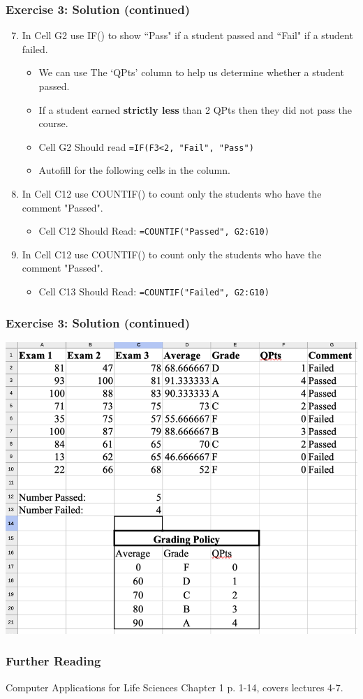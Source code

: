 \documentclass[12pt]{beamer}
\begin{document}
\begin{frame}
	\frametitle{Exercise 3: Solution (continued)}
		\begin{enumerate}
			\setcounter{enumi}{6}
			\item In Cell G2 use IF() to show ``Pass" if a student passed and ``Fail" if a student failed.
			\begin{itemize}
				\item We can use The `QPts' column to help us determine whether a student passed.
				\item If a student earned \textbf{strictly less} than 2 QPts then they did not pass the course.
				\item Cell G2 Should read \texttt{=IF(F3<2, "Fail", "Pass")} 
				\item Autofill for the following cells in the column.
			\end{itemize}
		\item In Cell C12 use COUNTIF() to count only the students who have the comment "Passed".
			\begin{itemize}
				\item Cell C12 Should Read: \texttt{=COUNTIF("Passed", G2:G10)}
			\end{itemize}
		\item In Cell C12 use COUNTIF() to count only the students who have the comment "Passed".
		\begin{itemize}
			\item Cell C13 Should Read: \texttt{=COUNTIF("Failed", G2:G10)}
		\end{itemize}
		\end{enumerate}
\end{frame}

\begin{frame}
	\frametitle{Exercise 3: Solution (continued)}
		\begin{center}
			\includegraphics[width= 0.8 \textwidth]{Exercise3Soln}
		\end{center}
	
\end{frame}	
\begin{frame}
	\frametitle{Further Reading}
	Computer Applications for Life Sciences Chapter 1 p. 1-14, 
	covers lectures 4-7. 
\end{frame}	
\end{document}

